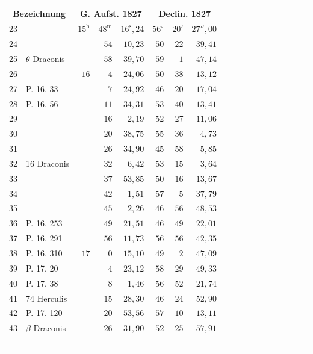 \begin{center}
\begin{minipage}[t]{.49\textwidth}
{\begin{tabular}{r|l|rrr|rrr|}
\end{tabular}}\end{minipage}\hfill
\begin{minipage}[t]{.49\textwidth}\centering
{\scriptsize\setlength{\tabcolsep}{1.2pt}\renewcommand{\arraystretch}{1.2}\begin{tabular}{r|l|rrr|rrr}
\multicolumn{2}{c|}{Bezeichnung}&\multicolumn{3}{c|}{G. Aufst. 1827}&\multicolumn{3}{c}{Declin. 1827}\\\hline
23&&$15^{\mathrm h}$&$48^{\mathrm m}$&$16^{\mathrm s}{,}24$&$56^\circ$&$20'$&$27''{,}00$\\
24&&&$54$&$10{,}23$&$50$&$22$&$39{,}41$\\
25&$\theta$ Draconis&&$58$&$39{,}70$&$59$&$1$&$47{,}14$\\
26&&$16$&$4$&$24{,}06$&$50$&$38$&$13{,}12$\\
27&P. 16. 33&&$7$&$24{,}92$&$46$&$20$&$17{,}04$\\
28&P. 16. 56&&$11$&$34{,}31$&$53$&$40$&$13{,}41$\\
29&&&$16$&$2{,}19$&$52$&$27$&$11{,}06$\\
30&&&$20$&$38{,}75$&$55$&$36$&$4{,}73$\\
31&&&$26$&$34{,}90$&$45$&$58$&$5{,}85$\\
32&16 Draconis&&$32$&$6{,}42$&$53$&$15$&$3{,}64$\\
33&&&$37$&$53{,}85$&$50$&$16$&$13{,}67$\\
34&&&$42$&$1{,}51$&$57$&$5$&$37{,}79$\\
35&&&$45$&$2{,}26$&$46$&$56$&$48{,}53$\\
36&P. 16. 253&&$49$&$21{,}51$&$46$&$49$&$22{,}01$\\
37&P. 16. 291&&$56$&$11{,}73$&$56$&$56$&$42{,}35$\\
38&P. 16. 310&$17$&$0$&$15{,}10$&$49$&$2$&$47{,}09$\\
39&P. 17. 20&&$4$&$23{,}12$&$58$&$29$&$49{,}33$\\
40&P. 17. 38&&$8$&$1{,}46$&$56$&$52$&$21{,}74$\\
41&74 Herculis&&$15$&$28{,}30$&$46$&$24$&$52{,}90$\\
42&P. 17. 120&&$20$&$53{,}56$&$57$&$10$&$13{,}11$\\
43&$\beta$ Draconis&&$26$&$31{,}90$&$52$&$25$&$57{,}91$\\
&&&&&&&\\
\end{tabular}}\end{minipage}
\end{center}
\begin{center}\rule{.24\textwidth}{.4pt}\end{center}

